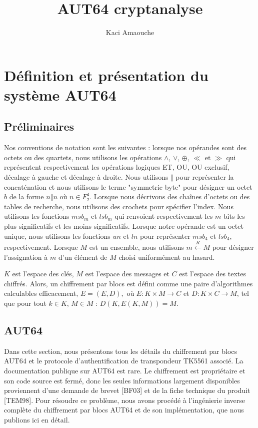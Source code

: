 \documentclass{template}
\title{AUT64 cryptanalyse}
\author{Kaci Amaouche}
\begin{document}
\chapter{Définition et présentation du système AUT64}

\section{Préliminaires}
\baselineskip=16pt
Nos conventions de notation sont les suivantes : lorsque nos opérandes sont des octets ou des quartets, nous utilisons les opérations $\land$, $\lor$, $\oplus$, $\ll$ et $\gg$ qui représentent respectivement les opérations logiques ET, OU, OU exclusif, décalage à gauche et décalage à droite. Nous utilisons $ \mathbin\Vert$ pour représenter la concaténation et nous utilisons le terme "symmetric byte" pour désigner un octet $b$ de la forme $n \mathbin\Vert n$ où $n \in F_{2}^{4}$. Lorsque nous décrivons des chaînes d'octets ou des tables de recherche, nous utilisons des crochets pour spécifier l'index. Nous utilisons les fonctions  $msb_m$ et $lsb_m$ qui renvoient respectivement les $m$ bits les plus significatifs et les moins significatifs. Lorsque notre opérande est un octet unique, nous utilisons les fonctions $un$ et $ln$ pour représenter $msb_4$ et $lsb_4$, respectivement. Lorsque $M$ est un ensemble, nous utilisons $m \overset{R}{\leftarrow} M$ pour désigner l'assignation à $m$ d'un élément de $M$ choisi uniformément au hasard.

$K$ est l'espace des clés, $M$ est l'espace des messages et $C$ est l'espace des textes chiffrés. Alors, un chiffrement par blocs est défini comme une paire d'algorithmes calculables efficacement, $E = (E, D),$ où $E : K \times M \to C$ et $D : K \times C \to M$, tel que pour tout $k \in K$, $M \in M$ :  $D(K, E(K, M)) = M$. 
    

\section{AUT64}
\baselineskip=16pt

Dans cette section, nous présentons tous les détails du chiffrement par blocs AUT64 et le protocole d'authentification de transpondeur TK5561 associé. La documentation publique sur AUT64 est rare. Le chiffrement est propriétaire et son code source est fermé, donc les seules informations largement disponibles proviennent d'une demande de brevet [BF03] et de la fiche technique du produit [TEM98]. Pour résoudre ce problème, nous avons procédé à l'ingénierie inverse complète du chiffrement par blocs AUT64 et de son implémentation, que nous publions ici en détail.
\end{document}
